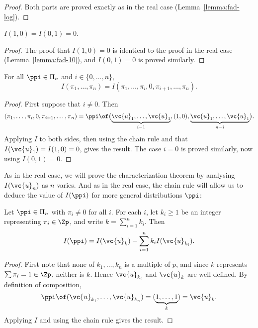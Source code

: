 \begin{proof}
Both parts are proved exactly as in the real case
(Lemma~\ref{lemma:fad-log}).  
\end{proof}

\begin{lemma}
$I(1, 0) = I(0, 1) = 0$.
\end{lemma}

\begin{proof}
The proof that $I(1, 0) = 0$ is identical to the proof in the real case
(Lemma~\ref{lemma:fad-10}), and $I(0, 1) = 0$ is proved similarly.
\end{proof}

\begin{lemma}
For all $\ppi \in \Pi_n$ and $i \in \{0, \ldots, n\}$, 
\[
I(\pi_1, \ldots, \pi_n)
=
I(\pi_1, \ldots, \pi_i, 0, \pi_{i + 1}, \ldots, \pi_n).
\]
\end{lemma}

\begin{proof}
First suppose that $i \neq 0$.  Then
\[
(\pi_1, \ldots, \pi_i, 0, \pi_{i + 1}, \ldots, \pi_n)
=
\ppi \of 
\bigl(\underbrace{\vc{u}_1, \ldots, \vc{u}_1}_{i - 1}, (1, 0), 
\underbrace{\vc{u}_1, \ldots, \vc{u}_1}_{n - i}\bigr).
\]
Applying $I$ to both sides, then using the chain rule and that $I(\vc{u}_1)
= I(1, 0) = 0$, gives the result.  The case $i = 0$ is proved similarly,
now using $I(0, 1) = 0$.
\end{proof}

As in the real case, we will prove the characterization theorem by
analysing $I(\vc{u}_n)$ as $n$ varies.  And as in the real case, the chain
rule will allow us to deduce the value of $I(\ppi)$ for more general
distributions $\ppi$:

\begin{lemma}
Let $\ppi \in \Pi_n$ with $\pi_i \neq 0$ for all $i$.  For each $i$, let
$k_i \geq 1$ be an integer representing $\pi_i \in \Zp$, and write $k =
\sum_{i = 1}^n k_i$.  Then 
\[
I(\ppi) = I(\vc{u}_k) - \sum_{i = 1}^n k_i I(\vc{u}_{k_i}).
\]
\end{lemma}

\begin{proof}
First note that none of $k_1, \ldots, k_n$ is a multiple of $p$, and since
$k$ represents $\sum \pi_i = 1 \in \Zp$, neither is $k$.  Hence
$\vc{u}_{k_i}$ and $\vc{u}_k$ are well-defined.  By definition of
composition,
\[
\ppi \of (\vc{u}_{k_1}, \ldots, \vc{u}_{k_n}) 
= 
(\underbrace{1, \ldots, 1}_k)
=
\vc{u}_k.
\]
Applying $I$ and using the chain rule gives the result.
\end{proof}

